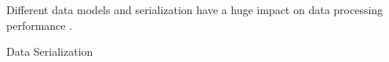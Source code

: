 

    
    



Different data models and serialization have a huge impact on data processing performance \cite{DBLP:conf/cloud/SikdarTJ17}. 


Data Serialization \cite{DBLP:conf/cloud/SikdarTJ17}